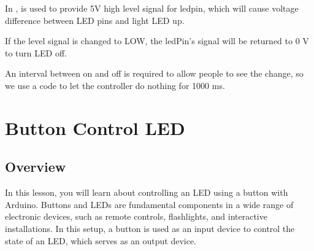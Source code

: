 \documentclass[a4paper,11pt,english]{sphinxmanual}
\begin{document}
\sphinxAtStartPar
In ,  is used to provide 5V high level signal for ledpin, which will cause voltage difference between LED pins and light LED up.

\begin{sphinxVerbatim}[commandchars=\\\{\}]
\end{sphinxVerbatim}

\sphinxAtStartPar
If the level signal is changed to LOW, the ledPin’s signal will be returned to 0 V to turn LED off.

\begin{sphinxVerbatim}[commandchars=\\\{\}]
\end{sphinxVerbatim}

\sphinxAtStartPar
An interval between on and off is required to allow people to see the change,
so we use a  code to let the controller do nothing for 1000 ms.

\begin{sphinxVerbatim}[commandchars=\\\{\}]
\end{sphinxVerbatim}

\sphinxstepscope


\section{Button Control LED}
\label{\detokenize{Basic_Project/Button_LED:button-control-led}}\label{\detokenize{Basic_Project/Button_LED:basic-button-led}}\label{\detokenize{Basic_Project/Button_LED::doc}}

\subsection{Overview}
\label{\detokenize{Basic_Project/Button_LED:overview}}
\sphinxAtStartPar
In this lesson, you will learn about controlling an LED using a button with Arduino. Buttons and LEDs are fundamental components in a wide range of electronic devices, such as remote controls, flashlights, and interactive installations. In this setup, a button is used as an input device to control the state of an LED, which serves as an output device.
\end{document}
